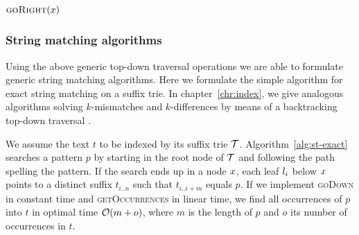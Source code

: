 \begin{algorithm}[h!]
\begin{minipage}[t]{.5\textwidth}
\label{alg:generic-godown}
\begin{algorithmic}[1]
		\State \Return \False
	\EndIf
		\State \Return \True
	\Else
		\State \Return $\Call{goRight}{$\Tn$}$		
	\EndIf
\EndProcedure
\end{algorithmic}
\end{minipage}
\begin{minipage}[t]{.5\textwidth}
\label{alg:generic-goright}
\begin{algorithmic}[1]
		\State \Return \False
	\EndIf
			\State \Return \True
		\EndIf
	\EndWhile
	\State \Return \False
\EndProcedure
\end{algorithmic}
\end{minipage}
\end{algorithm}


\subsubsection{String matching algorithms}

Using the above generic top-down traversal operations we are able to formulate generic string matching algorithms.
Here we formulate the simple algorithm for exact string matching on a suffix trie.
In chapter~\ref{chr:index}, we give analogous algorithms solving $k$-mismatches and $k$-differences by means of a backtracking top-down traversal \citep{Ukkonen1993, Baeza1999}.

We assume the text $t$ to be indexed by its suffix trie $\mathcal {T}$.
Algorithm~\ref{alg:st-exact} searches a pattern $p$ by starting in the root node of $\mathcal {T}$ and following the path spelling the pattern.
If the search ends up in a node $x$, each leaf $l_i$ below $x$ points to a distinct suffix $t_{i..n}$ such that $t_{i..i+m}$ equals $p$.
If we implement \textsc{goDown} in constant time and \textsc{getOccurrences} in linear time, we find all occurrences of $p$ into $t$ in optimal time $\mathcal{O}(m+o)$, where $m$ is the length of $p$ and $o$ its number of occurrences in $t$.

